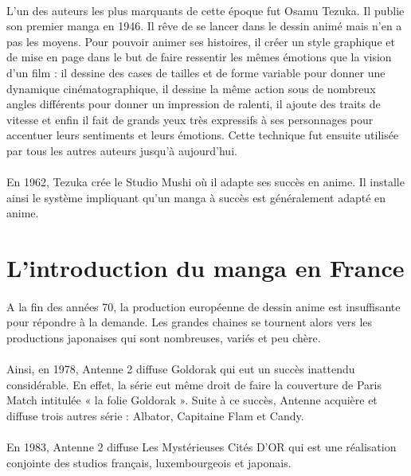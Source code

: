 \paragraph{}
L’un des auteurs les plus marquants de cette époque fut Osamu Tezuka. Il publie son premier manga en 1946. Il rêve de se lancer dans le dessin animé mais n’en a pas les moyens. Pour pouvoir animer ses histoires, il créer un style graphique et de mise en page dans le but de faire ressentir les mêmes émotions que la vision d’un film : il dessine des cases de tailles et de forme variable pour donner une dynamique cinématographique, il dessine la même action sous de nombreux angles différents pour donner un impression de ralenti, il ajoute des traits de vitesse et enfin il fait de grands yeux très expressifs à ses personnages pour accentuer leurs sentiments et leurs émotions. Cette technique fut ensuite utilisée par tous les autres auteurs jusqu’à aujourd’hui. 
\paragraph{}
En 1962, Tezuka crée le Studio Mushi où il adapte ses succès en anime. Il installe ainsi le système impliquant qu’un manga à succès est généralement adapté en anime.

\section{L'introduction du manga en France}
\paragraph{}
A la fin des années 70, la production européenne de dessin anime est insuffisante pour répondre à la demande. Les grandes chaines se tournent alors vers les productions japonaises qui sont nombreuses, variés et peu chère. 
\paragraph{}
Ainsi, en 1978, Antenne 2 diffuse Goldorak qui eut un succès inattendu considérable. En effet, la série eut même droit de faire la couverture de Paris Match intitulée « la folie Goldorak ».  Suite à ce succès, Antenne acquière et diffuse trois autres série : Albator, Capitaine Flam et Candy.
\paragraph{}
En 1983, Antenne 2 diffuse Les Mystérieuses Cités D’OR qui est une réalisation conjointe des studios français, luxembourgeois et japonais. 
